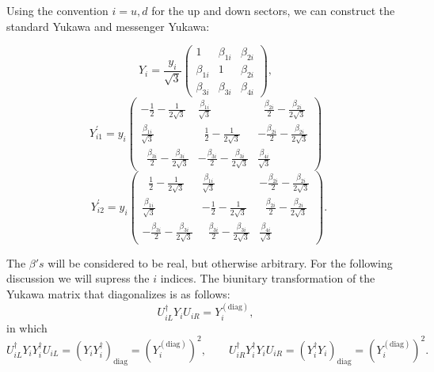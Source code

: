 Using the convention $i = u,d$ for the up and down sectors, we can construct the standard Yukawa and messenger Yukawa:

\begin{equation}
Y_i =  \frac{y_{i}}{\sqrt{3}} \left (\begin{array}{ccc} 1 & \beta_{1i} & \beta_{2i} \\ \beta_{1i} & 1 & \beta_{2i} \\ \beta_{3i} & \beta_{3i} & \beta_{4i}           \end{array} \right ),
\label{eq:yud}
\end{equation}
\begin{equation}
Y^\prime_{i1}=y_{i} \left (\begin{array}{ccc} -\frac{1}{2}-\frac{1}{2\sqrt{3}} & \frac{\beta_{1i}}{\sqrt{3}} & \;\; \frac{\beta_{2i}}{2} - \frac{\beta_{2i}}{2\sqrt{3}} \\  \frac{\beta_{1i}}{\sqrt{3}} & \;\; \frac{1}{2}-\frac{1}{2\sqrt{3}} & -\frac{\beta_{2i}}{2} - \frac{\beta_{2i}}{2\sqrt{3}} \\ \;\; \frac{\beta_{3i}}{2} - \frac{\beta_{3i}}{2\sqrt{3}} & -\frac{\beta_{3i}}{2} - \frac{\beta_{3i}}{2\sqrt{3}} & \frac{\beta_{4i}
}{\sqrt{3}}
\end{array} \right )
\end{equation}
\begin{equation}
\;\; Y^\prime_{i2}=y_{i} \left (\begin{array}{ccc} \;\; \frac{1}{2}-\frac{1}{2\sqrt{3}} & \frac{\beta_{1i}}{\sqrt{3}} &  -\frac{\beta_{2i}}{2} - \frac{\beta_{2i}}{2\sqrt{3}} \\  \frac{\beta_{1i}}{\sqrt{3}} & -\frac{1}{2}-\frac{1}{2\sqrt{3}} & \;\; \frac{\beta_{2i}}{2} - \frac{\beta_{2i}}{2\sqrt{3}} \\ -\frac{\beta_{3i}}{2} - \frac{\beta_{3i}}{2\sqrt{3}} & \;\; \frac{\beta_{3i}}{2} - \frac{\beta_{3i}}{2\sqrt{3}} & \frac{\beta_{4i}
}{\sqrt{3}}
\end{array} \right ).
\end{equation}

The $\beta's$ will be considered to be real, but otherwise arbitrary. For the following discussion we will supress the $i$ indices. The biunitary transformation of the Yukawa matrix that diagonalizes is as follows:
\begin{equation}
U_{iL}^\dagger Y_i U_{iR} =Y_i^{(\text{diag})},  
\end{equation}
in which
\begin{equation}
U_{iL}^\dagger Y_i Y_i^\dagger U_{iL}= (Y_iY_i^\dagger)_\text{diag} =(Y_i^{(\text{diag})})^2, \qquad U_{iR}^\dagger Y_i^\dagger Y_i U_{iR}= (Y_i^\dagger Y_i)_\text{diag}= (Y_i^{(\text{diag})})^2.
\end{equation}

